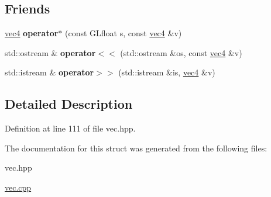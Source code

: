 \subsection*{Friends}
\begin{DoxyCompactItemize}
\item 
\hypertarget{struct_angel_1_1vec4_a18b1a91dc4c502220d099d6d85e504bc}{\hyperlink{struct_angel_1_1vec4}{vec4} {\bfseries operator$\ast$} (const G\-Lfloat s, const \hyperlink{struct_angel_1_1vec4}{vec4} \&v)}\label{struct_angel_1_1vec4_a18b1a91dc4c502220d099d6d85e504bc}

\item 
\hypertarget{struct_angel_1_1vec4_afadcf8884205c469256e4be7d96bfa12}{std\-::ostream \& {\bfseries operator$<$$<$} (std\-::ostream \&os, const \hyperlink{struct_angel_1_1vec4}{vec4} \&v)}\label{struct_angel_1_1vec4_afadcf8884205c469256e4be7d96bfa12}

\item 
\hypertarget{struct_angel_1_1vec4_ada396ae1c4ef513c6baf301f20f89bfa}{std\-::istream \& {\bfseries operator$>$$>$} (std\-::istream \&is, \hyperlink{struct_angel_1_1vec4}{vec4} \&v)}\label{struct_angel_1_1vec4_ada396ae1c4ef513c6baf301f20f89bfa}

\end{DoxyCompactItemize}


\subsection{Detailed Description}


Definition at line 111 of file vec.\-hpp.



The documentation for this struct was generated from the following files\-:\begin{DoxyCompactItemize}
\item 
vec.\-hpp\item 
\hyperlink{vec_8cpp}{vec.\-cpp}\end{DoxyCompactItemize}
